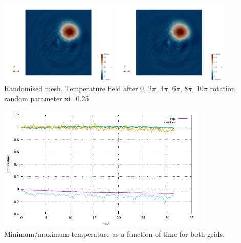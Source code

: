 \begin{center}
\includegraphics[width=5.6cm]{python_codes/fieldstone_45/results/random/T.0004.png}
\includegraphics[width=5.6cm]{python_codes/fieldstone_45/results/random/T.0005.png}\\
{\captionfont Randomised mesh. Temperature field after 0, $2\pi$, $4\pi$, $6\pi$, $8\pi$, $10\pi$ rotation.
random parameter xi=0.25} 
\end{center}

\begin{center}
\includegraphics[width=10cm]{python_codes/fieldstone_45/results/T.pdf}\\
{\captionfont Minimum/maximum temperature as a function of time for both grids.} 
\end{center}
